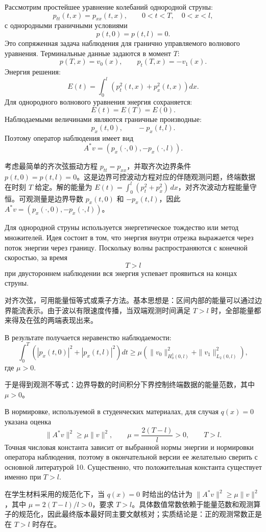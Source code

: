 \documentclass[12pt,a4paper]{article}
\newcommand{\zh}[1]{\par\noindent #1\par}
\begin{document}
\newpage
{}


Рассмотрим простейшее уравнение колебаний однородной струны:
\[
 p_{tt}(t,x)=p_{xx}(t,x),
 \qquad 0<t<T,\quad 0<x<l,
\]
с однородными граничными условиями
\[
 p(t,0)=p(t,l)=0.
\]
Это сопряженная задача наблюдения для гранично управляемого волнового уравнения. Терминальные данные задаются в момент $T$:
\[
 p(T,x)=v_0(x),
 \qquad
 p_t(T,x)=-v_1(x).
\]
Энергия решения:
\[
 E(t)=\int_0^l\left(p_t^2(t,x)+p_x^2(t,x)\right)dx.
\]
Для однородного волнового уравнения энергия сохраняется:
\[
 E(t)=E(T)=E(0).
\]
Наблюдаемыми величинами являются граничные производные:
\[
 p_x(t,0),\qquad -p_x(t,l).
\]
Поэтому оператор наблюдения имеет вид
\[
 A^*v=(p_x(\cdot,0),-p_x(\cdot,l)).
\]
\zh{考虑最简单的齐次弦振动方程 \(p_{tt}=p_{xx}\)，并取齐次边界条件 \(p(t,0)=p(t,l)=0\)。这是边界可控波动方程对应的伴随观测问题，终端数据在时刻 \(T\) 给定。解的能量为 \(E(t)=\int_0^l(p_t^2+p_x^2)\,dx\)，对齐次波动方程能量守恒。可观测量是边界导数 \(p_x(t,0)\) 和 \(-p_x(t,l)\)，因此 \(A^*v=(p_x(\cdot,0),-p_x(\cdot,l))\)。}

Для однородной струны используется энергетическое тождество или метод множителей. Идея состоит в том, что энергия внутри отрезка выражается через поток энергии через границу. Поскольку волны распространяются с конечной скоростью, за время
\[
 T>l
\]
при двустороннем наблюдении вся энергия успевает проявиться на концах струны.
\zh{对齐次弦，可用能量恒等式或乘子方法。基本思想是：区间内部的能量可以通过边界能流表示。由于波以有限速度传播，当双端观测时间满足 \(T>l\) 时，全部能量都来得及在弦的两端表现出来。}

В результате получается неравенство наблюдаемости:
\[
 \int_0^T\left(|p_x(t,0)|^2+|p_x(t,l)|^2\right)dt
 \ge
 \mu\left(\|v_0\|_{H_0^1(0,l)}^2+\|v_1\|_{L_2(0,l)}^2\right),
\]
где $\mu>0$.
\zh{于是得到观测不等式：边界导数的时间积分下界控制终端数据的能量范数，其中 \(\mu>0\)。}

В нормировке, используемой в студенческих материалах, для случая $q(x)=0$ указана оценка
\[
 \|A^*v\|^2\ge \mu\|v\|^2,
 \qquad
 \mu=\frac{2(T-l)}{l}>0,
 \qquad T>l.
\]
Точная числовая константа зависит от выбранной нормы энергии и нормировки оператора наблюдения, поэтому в окончательной версии ее желательно сверить с основной литературой 10. Существенно, что положительная константа существует именно при $T>l$.
\zh{在学生材料采用的规范化下，当 \(q(x)=0\) 时给出的估计为 \(\|A^*v\|^2\ge\mu\|v\|^2\)，其中 \(\mu=2(T-l)/l>0\)，要求 \(T>l\)。具体数值常数依赖于能量范数和观测算子的规范化，因此最终版本最好同主要文献核对；实质结论是：正的观测常数正是在 \(T>l\) 时存在。}
\end{document}
